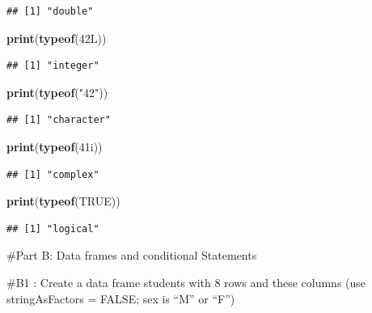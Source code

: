 \documentclass[
]{article}
\newenvironment{Shaded}{\begin{snugshade}}{\end{snugshade}}
\newcommand{\ConstantTok}[1]{\textcolor[rgb]{0.56,0.35,0.01}{#1}}
\newcommand{\DataTypeTok}[1]{\textcolor[rgb]{0.13,0.29,0.53}{#1}}
\newcommand{\DecValTok}[1]{\textcolor[rgb]{0.00,0.00,0.81}{#1}}
\newcommand{\FunctionTok}[1]{\textcolor[rgb]{0.13,0.29,0.53}{\textbf{#1}}}
\newcommand{\NormalTok}[1]{#1}
\newcommand{\StringTok}[1]{\textcolor[rgb]{0.31,0.60,0.02}{#1}}
\begin{document}
\begin{verbatim}
## [1] "double"
\end{verbatim}

\begin{Shaded}
\begin{Highlighting}[]
\FunctionTok{print}\NormalTok{(}\FunctionTok{typeof}\NormalTok{(}\DecValTok{42}\DataTypeTok{L}\NormalTok{))}
\end{Highlighting}
\end{Shaded}

\begin{verbatim}
## [1] "integer"
\end{verbatim}

\begin{Shaded}
\begin{Highlighting}[]
\FunctionTok{print}\NormalTok{(}\FunctionTok{typeof}\NormalTok{(}\StringTok{"42"}\NormalTok{))}
\end{Highlighting}
\end{Shaded}

\begin{verbatim}
## [1] "character"
\end{verbatim}

\begin{Shaded}
\begin{Highlighting}[]
\FunctionTok{print}\NormalTok{(}\FunctionTok{typeof}\NormalTok{(}\DecValTok{41}\DataTypeTok{i}\NormalTok{))}
\end{Highlighting}
\end{Shaded}

\begin{verbatim}
## [1] "complex"
\end{verbatim}

\begin{Shaded}
\begin{Highlighting}[]
\FunctionTok{print}\NormalTok{(}\FunctionTok{typeof}\NormalTok{(}\ConstantTok{TRUE}\NormalTok{))}
\end{Highlighting}
\end{Shaded}

\begin{verbatim}
## [1] "logical"
\end{verbatim}

\#Part B: Data frames and conditional Statements

\#B1 : Create a data frame students with 8 rows and these columns (use
stringAsFactors = FALSE; sex is ``M'' or ``F'')
\end{document}
